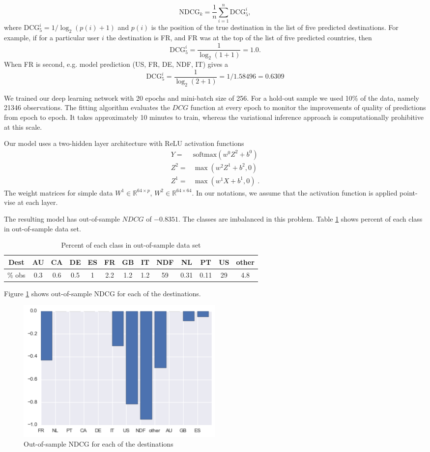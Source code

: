 \documentclass[12pt]{article}
\begin{document}
\[ \mathrm{NDCG}_k= \dfrac{1}{n}\sum_{i=1}^n\mathrm{DCG}_5^i, \]
where $\mathrm{DCG}_5^i = 1/\log_2{\left(p(i)+1\right)}$ and $p(i)$ is the position of the true destination in the list of five predicted destinations. For example, if for a particular user $i$ the destination is FR, and FR was at the top of the list of five predicted countries,  then 
\[
\mathrm{DCG}_5^i=\dfrac{1}{\log_2(1+1)}=1.0.
\] 
When FR is second, e.g. model prediction (US, FR, DE, NDF, IT) gives a 
\[
\mathrm{DCG}_5^i=\dfrac{1}{\log_2(2+1)}=1/1.58496=0.6309
\]

We trained our deep learning  network with 20 epochs and mini-batch size of 256.  For a hold-out sample we used 10\% of the data, namely 21346 observations. The fitting algorithm evaluates the $DCG$ function at every epoch to monitor the improvements of quality of predictions from epoch to epoch. It takes approximately 10 minutes to train, whereas the variational inference approach is computationally prohibitive at this scale. 

Our model uses a two-hidden layer architecture with ReLU activation functions
\begin{align*}
Y =  &\mathrm{softmax}(w^0Z^2 + b^0)\\
Z^2 = &\max(w^2Z^1 + b^2,0)\\
Z^1 = & \max(w^1X + b^1,0) \; .
\end{align*}
The weight matrices for simple data $W^1 \in \mathbb{R}^{64 \times p}$, $W^2 \in \mathbb{R}^{64 \times 64}$. In our notations, we assume that the activation function is applied point-vise at each layer.


The resulting model has out-of-sample $NDCG$ of  $-0.8351$. The classes are imbalanced in this problem. Table \ref{tab:dest_percent} shows percent of each class in out-of-sample data set.
\begin{table}
\centering
\begin{tabular}{c|c|c|c|c|c|c|c|c|c|c|c|c}
	Dest & AU & CA & DE & ES & FR & GB & IT & NDF & NL & PT & US & other \\ 
	\hline 
	\% obs & 0.3 & 0.6 & 0.5 & 1 & 2.2 & 1.2 & 1.2 & 59 & 0.31 & 0.11 & 29 & 4.8 \\ 
\end{tabular} 
\caption{Percent of each class in out-of-sample data set}
\label{tab:dest_percent}
\end{table}


Figure \ref{fig:ndcg} shows out-of-sample NDCG for each of the destinations.
\begin{figure}[H]
\centering
\includegraphics[width=0.5\textwidth]{ndcg}
\caption{Out-of-sample NDCG for each of the destinations}
\label{fig:ndcg}
\end{figure}
\end{document}
